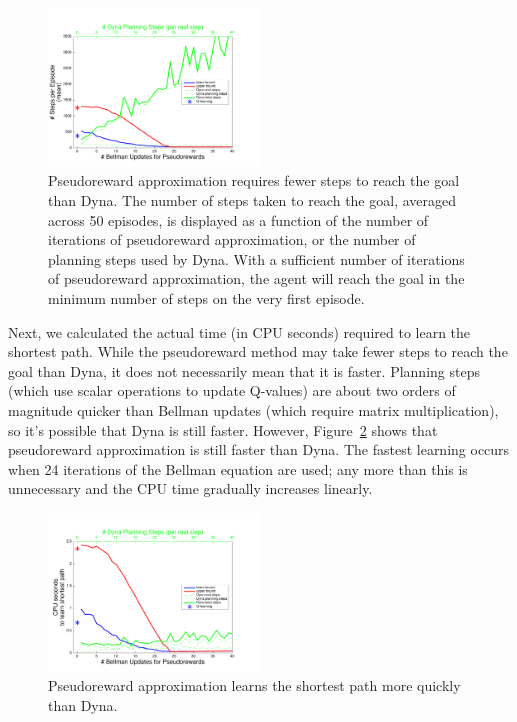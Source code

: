 \documentclass[letterpaper]{article}
\begin{document}
\begin{figure}[ht]
\centering
\includegraphics[width=0.5\textwidth]{learning_vs_PRiterations_DYNA_mean}
\caption{Pseudoreward approximation requires fewer steps to reach the goal than Dyna. The number of steps taken to reach the goal, averaged across 50 episodes, is displayed as a function of the number of iterations of pseudoreward approximation, or the number of planning steps used by Dyna. With a sufficient number of iterations of pseudoreward approximation, the agent will reach the goal in the minimum number of steps on the very first episode.}
\label{fig:maze1}
\end{figure}

Next, we calculated the actual time (in CPU seconds) required to learn the shortest path. While the pseudoreward method may take fewer steps to reach the goal than Dyna, it does not necessarily mean that it is faster. Planning steps (which use scalar operations to update Q-values) are about two orders of magnitude quicker than Bellman updates (which require matrix multiplication), so it's possible that Dyna is still faster. However, Figure~\ref{fig:maze2} shows that pseudoreward approximation is still faster than Dyna. The fastest learning occurs when 24 iterations of the Bellman equation are used; any more than this is unnecessary and the CPU time gradually increases linearly.

\begin{figure}[ht]
\centering
\includegraphics[width=0.5\textwidth]{cpus_vs_PRiterations_DYNA_toGoal}
\caption{Pseudoreward approximation learns the shortest path more quickly than Dyna.}
\label{fig:maze2}
\end{figure}
\end{document}
